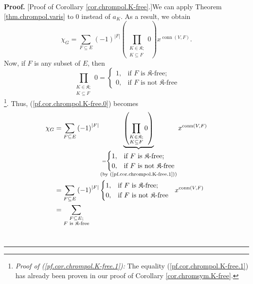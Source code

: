 \documentclass[numbers=enddot,12pt,final,onecolumn,notitlepage]{scrartcl}%
\theoremstyle{definition}
\newenvironment{proof}[1][Proof]{\noindent\textbf{#1.} }{\ \rule{0.5em}{0.5em}}
\newenvironment{verlong}{}{}
\let\sumnonlimits\sum
\let\prodnonlimits\prod
\renewcommand{\sum}{\sumnonlimits\limits}
\renewcommand{\prod}{\prodnonlimits\limits}
\begin{document}
\begin{verlong}
\begin{proof}
[Proof of Corollary \ref{cor.chrompol.K-free}.]We can apply Theorem
\ref{thm.chrompol.varis} to $0$ instead of $a_{K}$. As a result, we obtain%
\begin{equation}
\chi_{G}=\sum_{F\subseteq E}\left(  -1\right)  ^{\left\vert F\right\vert
}\left(  \prod_{\substack{K\in\mathfrak{K};\\K\subseteq F}}0\right)
x^{\operatorname*{conn}\left(  V,F\right)  }. \label{pf.cor.chrompol.K-free.0}%
\end{equation}
Now, if $F$ is any subset of $E$, then%
\begin{equation}
\prod_{\substack{K\in\mathfrak{K};\\K\subseteq F}}0=%
\begin{cases}
1, & \text{if }F\text{ is }\mathfrak{K}\text{-free;}\\
0, & \text{if }F\text{ is not }\mathfrak{K}\text{-free}%
\end{cases}
\label{pf.cor.chrompol.K-free.1}%
\end{equation}
\footnote{\textit{Proof of (\ref{pf.cor.chrompol.K-free.1}):} The equality
(\ref{pf.cor.chrompol.K-free.1}) has already been proven in our proof of
Corollary \ref{cor.chromsym.K-free}.}. Thus, (\ref{pf.cor.chrompol.K-free.0})
becomes%
\begin{align*}
\chi_{G}  &  =\sum_{F\subseteq E}\left(  -1\right)  ^{\left\vert F\right\vert
}\underbrace{\left(  \prod_{\substack{K\in\mathfrak{K};\\K\subseteq
F}}0\right)  }_{\substack{=%
\begin{cases}
1, & \text{if }F\text{ is }\mathfrak{K}\text{-free;}\\
0, & \text{if }F\text{ is not }\mathfrak{K}\text{-free}%
\end{cases}
\\\text{(by (\ref{pf.cor.chrompol.K-free.1}))}}}x^{\operatorname*{conn}\left(
V,F\right)  }\\
&  =\sum_{F\subseteq E}\left(  -1\right)  ^{\left\vert F\right\vert }%
\begin{cases}
1, & \text{if }F\text{ is }\mathfrak{K}\text{-free;}\\
0, & \text{if }F\text{ is not }\mathfrak{K}\text{-free}%
\end{cases}
\ \ x^{\operatorname*{conn}\left(  V,F\right)  }\\
&  =\sum_{\substack{F\subseteq E;\\F\text{ is }\mathfrak{K}\text{-free}%
}}
\end{align*}
\end{proof}
\end{verlong}
\end{document}
